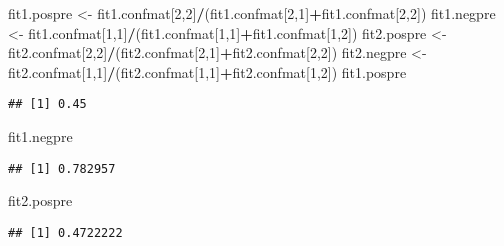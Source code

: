 \documentclass[]{article}
\newenvironment{Shaded}{\begin{snugshade}}{\end{snugshade}}
\newcommand{\DecValTok}[1]{\textcolor[rgb]{0.00,0.00,0.81}{#1}}
\newcommand{\StringTok}[1]{\textcolor[rgb]{0.31,0.60,0.02}{#1}}
\newcommand{\OperatorTok}[1]{\textcolor[rgb]{0.81,0.36,0.00}{\textbf{#1}}}
\newcommand{\NormalTok}[1]{#1}
\begin{document}
\begin{Shaded}
\begin{Highlighting}[]
\NormalTok{fit1.pospre <-}\StringTok{ }\NormalTok{fit1.confmat[}\DecValTok{2}\NormalTok{,}\DecValTok{2}\NormalTok{]}\OperatorTok{/}\NormalTok{(fit1.confmat[}\DecValTok{2}\NormalTok{,}\DecValTok{1}\NormalTok{]}\OperatorTok{+}\NormalTok{fit1.confmat[}\DecValTok{2}\NormalTok{,}\DecValTok{2}\NormalTok{])}
\NormalTok{fit1.negpre <-}\StringTok{ }\NormalTok{fit1.confmat[}\DecValTok{1}\NormalTok{,}\DecValTok{1}\NormalTok{]}\OperatorTok{/}\NormalTok{(fit1.confmat[}\DecValTok{1}\NormalTok{,}\DecValTok{1}\NormalTok{]}\OperatorTok{+}\NormalTok{fit1.confmat[}\DecValTok{1}\NormalTok{,}\DecValTok{2}\NormalTok{])}
\NormalTok{fit2.pospre <-}\StringTok{ }\NormalTok{fit2.confmat[}\DecValTok{2}\NormalTok{,}\DecValTok{2}\NormalTok{]}\OperatorTok{/}\NormalTok{(fit2.confmat[}\DecValTok{2}\NormalTok{,}\DecValTok{1}\NormalTok{]}\OperatorTok{+}\NormalTok{fit2.confmat[}\DecValTok{2}\NormalTok{,}\DecValTok{2}\NormalTok{])}
\NormalTok{fit2.negpre <-}\StringTok{ }\NormalTok{fit2.confmat[}\DecValTok{1}\NormalTok{,}\DecValTok{1}\NormalTok{]}\OperatorTok{/}\NormalTok{(fit2.confmat[}\DecValTok{1}\NormalTok{,}\DecValTok{1}\NormalTok{]}\OperatorTok{+}\NormalTok{fit2.confmat[}\DecValTok{1}\NormalTok{,}\DecValTok{2}\NormalTok{])}
\NormalTok{fit1.pospre}
\end{Highlighting}
\end{Shaded}

\begin{verbatim}
## [1] 0.45
\end{verbatim}

\begin{Shaded}
\begin{Highlighting}[]
\NormalTok{fit1.negpre}
\end{Highlighting}
\end{Shaded}

\begin{verbatim}
## [1] 0.782957
\end{verbatim}

\begin{Shaded}
\begin{Highlighting}[]
\NormalTok{fit2.pospre}
\end{Highlighting}
\end{Shaded}

\begin{verbatim}
## [1] 0.4722222
\end{verbatim}
\end{document}
